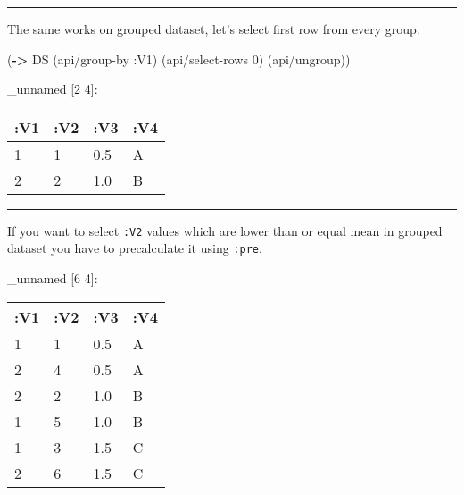\documentclass[]{article}
\newenvironment{Shaded}{\begin{snugshade}}{\end{snugshade}}
\newcommand{\AttributeTok}[1]{\textcolor[rgb]{0.77,0.63,0.00}{#1}}
\newcommand{\DecValTok}[1]{\textcolor[rgb]{0.00,0.00,0.81}{#1}}
\newcommand{\KeywordTok}[1]{\textcolor[rgb]{0.13,0.29,0.53}{\textbf{#1}}}
\newcommand{\NormalTok}[1]{#1}
\newcommand{\VariableTok}[1]{\textcolor[rgb]{0.00,0.00,0.00}{#1}}
\begin{document}
\begin{center}\rule{0.5\linewidth}{0.5pt}\end{center}

The same works on grouped dataset, let's select first row from every
group.

\begin{Shaded}
\begin{Highlighting}[]
\NormalTok{(}\KeywordTok{->}\NormalTok{ DS}
\NormalTok{    (api/group-by }\AttributeTok{:V1}\NormalTok{)}
\NormalTok{    (api/select-rows }\DecValTok{0}\NormalTok{)}
\NormalTok{    (api/ungroup))}
\end{Highlighting}
\end{Shaded}

\_unnamed {[}2 4{]}:

\begin{longtable}[]{@{}llll@{}}
\toprule
:V1 & :V2 & :V3 & :V4\tabularnewline
\midrule
\endhead
1 & 1 & 0.5 & A\tabularnewline
2 & 2 & 1.0 & B\tabularnewline
\bottomrule
\end{longtable}

\begin{center}\rule{0.5\linewidth}{0.5pt}\end{center}

If you want to select \texttt{:V2} values which are lower than or equal
mean in grouped dataset you have to precalculate it using \texttt{:pre}.

\begin{Shaded}
\end{Shaded}

\_unnamed {[}6 4{]}:

\begin{longtable}[]{@{}llll@{}}
\toprule
:V1 & :V2 & :V3 & :V4\tabularnewline
\midrule
\endhead
1 & 1 & 0.5 & A\tabularnewline
2 & 4 & 0.5 & A\tabularnewline
2 & 2 & 1.0 & B\tabularnewline
1 & 5 & 1.0 & B\tabularnewline
1 & 3 & 1.5 & C\tabularnewline
2 & 6 & 1.5 & C\tabularnewline
\bottomrule
\end{longtable}
\end{document}
